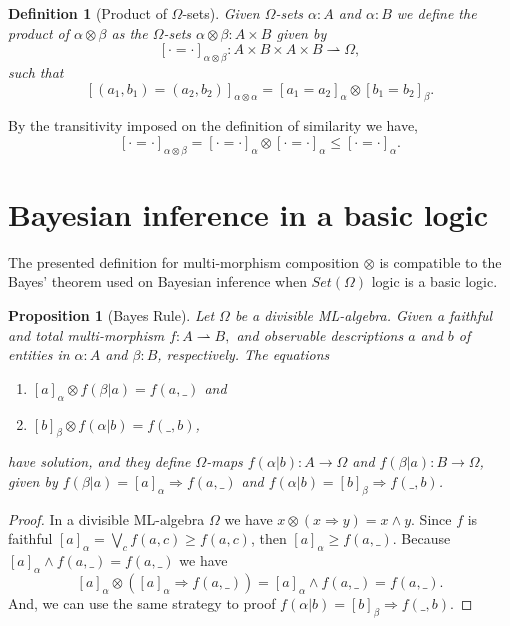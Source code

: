 \documentclass[oribibl]{llncs}
\newtheorem{prop}{Proposition}
\newtheorem{defn}{Definition}
\begin{document}
\begin{defn}[Product of $\Omega$-sets]\label{ProdSimil}
Given $\Omega$-sets $\alpha:A$ and $\alpha:B$ we define the product of $\alpha\otimes\beta$ as the $\Omega$-sets $\alpha\otimes\beta:A\times B$ given by
\[[\cdot=\cdot]_{\alpha\otimes\beta}:A\times B\times A\times B\rightharpoonup \Omega,\] such that
\[[(a_1,b_1)=(a_2,b_2)]_{\alpha\otimes\alpha}=[a_1=a_2]_{\alpha}\otimes[b_1=b_2]_{\beta}.\]
\end{defn}

By the transitivity imposed on the definition of similarity we have,   \[[\cdot=\cdot]_{\alpha\otimes\beta}=[\cdot=\cdot]_\alpha\otimes[\cdot=\cdot]_\alpha\leq[\cdot=\cdot]_\alpha.\]

\section{Bayesian inference in a basic logic}\label{bayesian inference}
The presented definition for multi-morphism composition $\otimes$ is compatible to the Bayes' theorem used on Bayesian inference when  $Set(\Omega)$ logic is a basic logic.

\begin{prop}[Bayes Rule]
Let $\Omega$ be a divisible ML-algebra. Given a faithful and total multi-morphism ${f:A\rightharpoonup B,}$ and observable descriptions $a$ and $b$ of entities in $\alpha:A$ and $\beta:B$, respectively. The equations
\begin{enumerate}
  \item $[a]_\alpha\otimes f(\beta|a) = f(a,\_)$ and
  \item $[b]_\beta\otimes f(\alpha|b) = f(\_,b)$,
\end{enumerate}
have solution, and they define $\Omega$-maps $f(\alpha|b):A\rightarrow \Omega$ and $f(\beta|a):B\rightarrow \Omega$, given by $f(\beta|a)=[a]_\alpha\Rightarrow f(a,\_)$ and $f(\alpha|b)=[b]_\beta\Rightarrow f(\_,b)$.
\end{prop}

\begin{proof}
In a divisible ML-algebra $\Omega$ we have $x\otimes(x\Rightarrow y)=x\wedge y$. Since $f$ is faithful $[a]_\alpha=\bigvee_cf(a,c)\geq f(a,c)$, then $[a]_\alpha\geq f(a,\_)$. Because $[a]_\alpha\wedge f(a,\_)=f(a,\_)$ we have
\[
[a]_\alpha\otimes([a]_\alpha\Rightarrow f(a,\_))=[a]_\alpha\wedge f(a,\_)=f(a,\_).
\]
And, we can use the same strategy to proof  $f(\alpha|b)=[b]_\beta\Rightarrow f(\_,b)$.
\end{proof}
\end{document}
